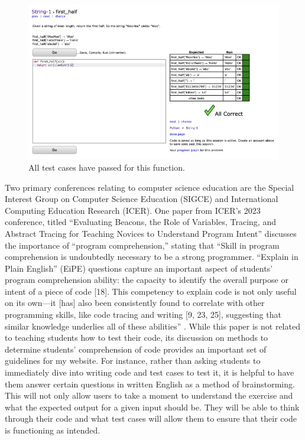 \documentclass[10pt,twocolumn]{article}
\begin{document}
\begin{figure}
    \centering
    \includegraphics[width=.95\linewidth]{CodingBat3.png}
    \caption{
        All test cases have passed for this function.
    }
    \label{fig:first-page}
\end{figure}

Two primary conferences relating to computer science education are the Special Interest Group on Computer Science Education (SIGCE) and International Computing Education Research (ICER). One paper from ICER’s 2023 conference, titled “Evaluating Beacons, the Role of Variables, Tracing, and Abstract Tracing for Teaching Novices to Understand Program Intent” discusses the importance of “program comprehension,” stating that “Skill in program comprehension is undoubtedly necessary to be a strong programmer. “Explain in Plain English” (EiPE) questions capture an important aspect of students’ program comprehension ability: the capacity to identify the overall purpose or intent of a piece of code [18]. This competency to explain code is not only useful on its own—it [has] also been consistently found to correlate with other programming skills, like code tracing and writing [9, 23, 25], suggesting that similar knowledge underlies all of these abilities” \cite{Teaching}. While this paper is not related to teaching students how to test their code, its discussion on methods to determine students’ comprehension of code provides an important set of guidelines for my website. For instance, rather than asking students to immediately dive into writing code and test cases to test it, it is helpful to have them answer certain questions in written English as a method of brainstorming. This will not only allow users to take a moment to understand the exercise and what the expected output for a given input should be. They will be able to think through their code and what test cases will allow them to ensure that their code is functioning as intended.
\end{document}
